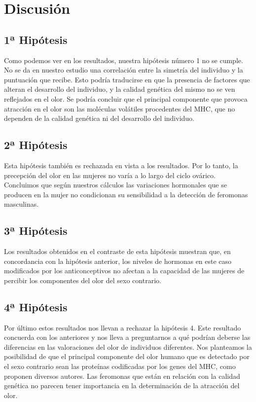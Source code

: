 \documentclass[fleqn,10pt]{SelfArx} %
\begin{document}
\section{Discusión}

\subsection{1ª Hipótesis}

Como podemos ver en los resultados, nuestra hipótesis número 1 no se cumple. No se da en nuestro estudio una correlación entre la simetría del individuo y la puntuación que recibe. Esto podría traducirse en que la presencia de factores que alteran el desarrollo del individuo, y la calidad genética del mismo no se ven reflejados en el olor. Se podría concluir que el principal componente que provoca atracción en el olor son las moléculas volátiles procedentes del MHC, que no dependen de la calidad genética ni del desarrollo del individuo.

\subsection{2ª Hipótesis}

Esta hipótesis también es rechazada en vista a los resultados. Por lo tanto, la precepción del olor en las mujeres no varía a lo largo del ciclo ovárico. Concluimos que según nuestros cálculos las variaciones hormonales que se producen en la mujer no condicionan su sensibilidad a la detección de feromonas masculinas.

\subsection{3ª Hipótesis}

Los resultados obtenidos en el contraste de esta hipótesis muestran que, en concordancia con la hipótesis anterior, los niveles de hormonas en este caso modificados por los anticonceptivos no afectan a la capacidad de las mujeres de percibir los componentes del olor del sexo contrario.

\subsection{4ª Hipótesis}

Por último estos resultados nos llevan a rechazar la hipótesis 4. Este resultado concuerda con los anteriores y nos lleva a preguntarnos a qué podrían deberse las diferencias en las valoraciones del olor de individuos diferentes. Nos planteamos la posibilidad de que el principal componente del olor humano que es detectado por el sexo contrario sean las proteínas codificadas por los genes del MHC, como proponen diversos autores. Las feromonas que están en relación con la calidad genética no parecen tener importancia en la determinación de la atracción del olor.
\end{document}
